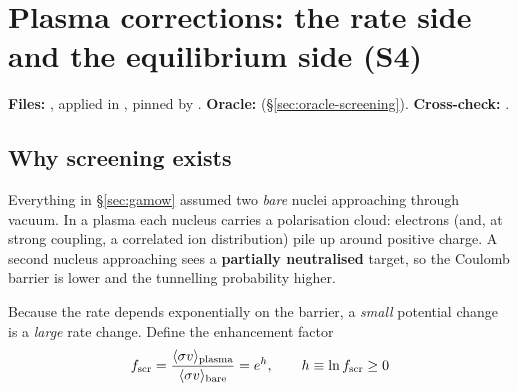 %

\section{Plasma corrections: the rate side and the equilibrium side (S4)}
\label{part:plasma}

\begin{repopointer}
\textbf{Files:} , applied in
, pinned by . \quad
\textbf{Oracle:}
(\S\ref{sec:oracle-screening}). \quad
\textbf{Cross-check:} .
\end{repopointer}

\subsection{Why screening exists}
\label{sec:whyscreening}

Everything in \S\ref{sec:gamow} assumed two \emph{bare} nuclei approaching
through vacuum. In a plasma each nucleus carries a polarisation cloud: electrons
(and, at strong coupling, a correlated ion distribution) pile up around positive
charge. A second nucleus approaching sees a \textbf{partially neutralised}
target, so the Coulomb barrier is lower and the tunnelling probability higher.

Because the rate depends exponentially on the barrier, a \emph{small} potential
change is a \emph{large} rate change. Define the enhancement factor
%
\begin{equation*}
f_{\rm scr} = \frac{\langle\sigma v\rangle_{\rm plasma}}{\langle\sigma v\rangle_{\rm bare}}
= e^{h}, \qquad h \equiv \ln f_{\rm scr} \ge 0
\end{equation*}

